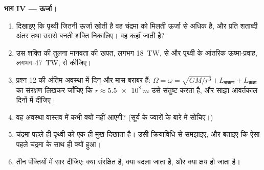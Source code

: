 \begin{problem}
\medskip
\noindent\textbf{भाग IV --- ऊर्जा।}
\begin{enumerate}[resume]
  \item दिखाइए कि पृथ्वी जितनी ऊर्जा खोती है वह चंद्रमा को मिलती ऊर्जा से
        अधिक है, और प्रति शताब्दी अंतर तथा उससे बनती शक्ति निकालिए। वह
        कहाँ जाती है?
  \item उस शक्ति की तुलना मानवता की खपत, लगभग \qty{18}{TW}, से और पृथ्वी
        के आंतरिक ऊष्मा-प्रवाह, लगभग \qty{47}{TW}, से कीजिए।
  \item प्रश्न 12 की अंतिम अवस्था में दिन और मास बराबर हैं:
        $\Omega = \omega = \sqrt{GM/r^3}$। $L_{\text{चक्रण}} + L_{\text{कक्षा}}$
        का संरक्षण लिखकर जाँचिए कि $r \approx
        \qty{5.5e8}{m}$ उसे संतुष्ट करता है, और साझा आवर्तकाल दिनों में
        दीजिए।
  \item वह अवस्था वास्तव में कभी क्यों नहीं आएगी? (सूर्य के ज्वारों के
        बारे में सोचिए।)
  \item चंद्रमा पहले ही पृथ्वी को एक ही मुख दिखाता है। उसी क्रियाविधि से
        समझाइए, और बताइए कि ऐसा पहले चंद्रमा के साथ ही क्यों हुआ।
  \item तीन पंक्तियों में सार दीजिए: क्या संरक्षित है, क्या बदला जाता है,
        और क्या क्षय हो जाता है।
\end{enumerate}
\end{problem}
